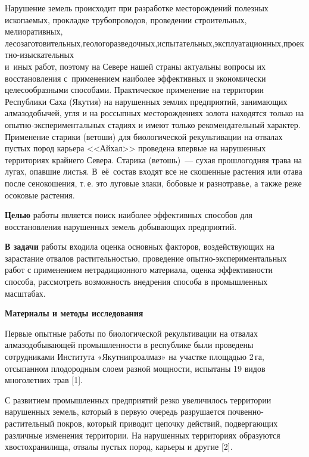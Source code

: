 
 



\makeProcTitle

Нарушение земель происходит при разработке месторождений полезных ископаемых, прокладке трубопроводов, проведении строительных, мелиоративных, лесозаготовительных,\;\;геологоразведочных,\;\;испытательных,\;\;эксплуатационных,\;\;проектно-изыскательных\\и~иных работ, поэтому на Севере нашей страны актуальны вопросы их восстановления с~применением наиболее эффективных и экономически целесообразными способами. Практическое применение на территории Республики Саха (Якутия) на нарушенных землях предприятий, занимающих алмазодобычей, угля и на россыпных месторождениях золота находятся только на опытно-экспериментальных стадиях и имеют только рекомендательный характер.  Применение старики (ветоши) для биологической рекультивации на отвалах пустых пород карьера <<Айхал>> проведена впервые на нарушенных территориях крайнего Севера. Старика (ветошь)~--- сухая прошлогодняя трава на лугах, опавшие листья. В~её~состав входят все не скошенные растения или отава после сенокошения, т.\,е. это луговые злаки, бобовые и разнотравье, а также реже осоковые растения.

\textbf{Целью} работы является поиск наиболее эффективных способов для восстановления нарушенных земель добывающих предприятий.

\textbf{В задачи} работы входила оценка основных факторов, воздействующих на зарастание отвалов растительностью, проведение опытно-экс\-пе\-ри\-мен\-таль\-ных работ с применением нетрадиционного материала, оценка эффективности способа, рассмотреть возможность внедрения способа в промышленных масштабах.

\textbf{Материалы и методы исследования}

Первые опытные работы по биологической рекультивации на отвалах алмазодобывающей промышленности в республике были проведены сотрудниками Института «Якутнипроалмаз» на участке площадью 2\,га, отсыпанном плодородным слоем разной мощности, испытаны 19 видов многолетних трав [1].

С развитием промышленных предприятий резко увеличилось территории нарушенных земель, который в первую очередь разрушается почвенно-растительный покров, который приводит цепочку действий, подвергающих различные изменения территории. На нарушенных территориях образуются хвостохранилища, отвалы пустых пород, карьеры и другие [2].

